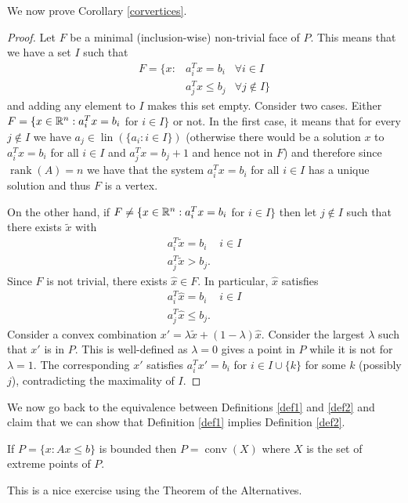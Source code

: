 \documentclass[12pt]{article}
\newcommand{\lin}{\operatorname{lin}}
\newcommand{\conv}{\operatorname{conv}}
\newcommand{\rank}{\operatorname{rank}}
\begin{document}
We now prove Corollary \ref{corvertices}. 

\begin{proof}
Let $F$ be a minimal (inclusion-wise) non-trivial face of $P$. This
means that we have a set $I$ such that 
$$\begin{array}{lll}
F=\{x: & a_i^Tx = b_i  & \forall i\in I \\
       & a_j^Tx\leq b_j & \forall j\notin I \}
\end{array}
$$ and adding any element to $I$ makes this set empty. Consider two
cases. Either $F=\{x\in {\mathbb R}^n: a^T_ix=b_i$ for $i\in I\}$ or not. In
the first case, it means that for every $j\notin I$ we have $a_j\in
\lin(\{a_i: i\in I\})$ (otherwise there would be a solution $x$ to
$a_i^Tx = b_i$ for all $i\in I$ and $a_j^Tx=b_j+1$ and hence not in
$F$) and therefore since $\rank(A)=n$ we have that the
system $a_i^Tx=b_i$ for all $i\in I$ has a unique solution and thus $F$ is
a vertex. 

On the other hand, if $F\neq \{x\in {\mathbb R}^n: a^T_ix=b_i$ for $i\in I\}$
then let $j\notin I$ such that there exists $\tilde{x}$ with 
$$\begin{array}{ll}
a_i^T\tilde{x} = b_i  & i\in I \\
a_j^T\tilde{x} > b_j. 
\end{array}
$$ Since $F$ is not trivial, there exists $\hat{x}\in F$. In
particular, $\hat{x}$ satisfies $$\begin{array}{ll}
a_i^T\hat{x} = b_i  & i\in I \\
a_j^T\hat{x} \leq b_j. 
\end{array}$$ Consider a convex combination $x'=\lambda \tilde{x} + (1-\lambda)
\hat{x}$. Consider the largest $\lambda$ such that $x'$ is in
$P$. This is well-defined as $\lambda=0$ gives a point in $P$ while it
is not for $\lambda=1$. The corresponding $x'$ satisfies  $a_i^T x' =
b_i $ for $i\in I\cup\{k\}$ for some $k$ (possibly $j$),
contradicting the maximality of $I$.   
\end{proof}


We now go back to the equivalence between Definitions \ref{def1} and
\ref{def2} and claim that we can show that Definition \ref{def1}
implies Definition \ref{def2}. 
\begin{theorem} \label{boundedconv}
If $P=\{x: Ax \leq b\}$ is bounded then $P=\conv(X)$ where $X$ is the
set of extreme points of $P$.
\end{theorem}
This is a nice exercise using the Theorem of the Alternatives.
\end{document}
